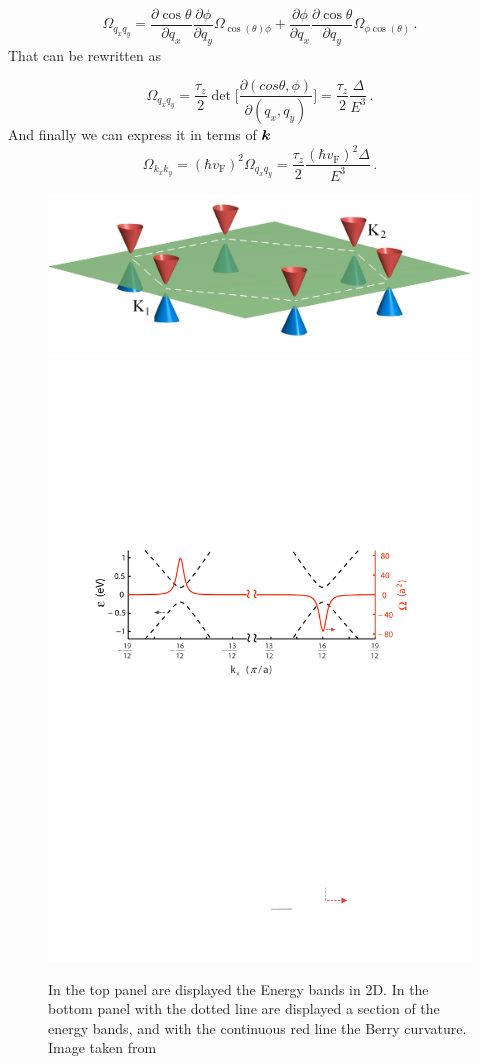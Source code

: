 \begin{equation}
    \Omega_{q_xq_y}=\frac{\partial\cos \theta}{\partial q_x}\frac{\partial \phi}{\partial q_y}\Omega_{\cos(\theta)\phi}+\frac{\partial \phi}{\partial q_x}\frac{\partial\cos \theta}{\partial q_y}\Omega_{\phi\cos(\theta)} \,.
\end{equation}
That can be rewritten as

\begin{equation}
    \Omega_{q_xq_y}=\frac {\tau_z}2 \det\bigg[\frac{\partial (cos\theta,\phi)}{\partial (q_x,q_y)}\bigg]=
    \frac {\tau_z}2 \frac{\Delta}{E^3}\,.
    \label{eq:dirac-curvature-q}
\end{equation}
And finally we can express it in terms of $\boldsymbol{k}$
\begin{equation}
    \Omega_{k_xk_y}=(\hbar v_\textrm{F})^2\Omega_{q_xq_y}=\frac {\tau_z}2 \frac{(\hbar v_\textrm{F})^2\Delta}{E^3}\,.
\end{equation}
\begin{figure}
    \centering
    \includegraphics[width=0.7\linewidth]{Immagini/ValleyHall/band_graphene.pdf}
    \includegraphics[width=0.7\linewidth]{Immagini/ValleyHall/curvature_graphene.pdf}
    \caption{In the top panel are displayed the Energy bands in 2D. In the bottom panel with the dotted line are displayed a section of the energy bands, and with the continuous red line the Berry curvature. Image taken from \cite{xiao2007valley}}
    \label{fig:cones}
\end{figure}
